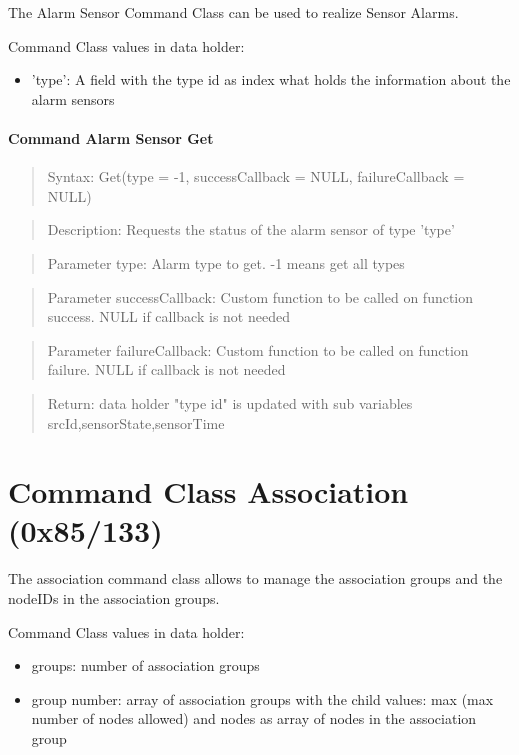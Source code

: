 The Alarm Sensor Command Class can be used to realize Sensor Alarms.

Command Class values in data holder:
\begin{itemize}
\item 'type': A field with the type id as index what holds the information about the alarm sensors
\end{itemize}

\paragraph {Command Alarm Sensor Get}
\begin{quote} Syntax: Get(type = -1, successCallback = NULL, failureCallback = NULL)\end{quote}
\begin{quote} Description: Requests the status of  the alarm sensor of type 'type'\end{quote}
\begin{quote} Parameter type:  Alarm type to get. -1 means get all types\end{quote}
\begin{quote} Parameter successCallback: Custom function to be called on function success. NULL if callback is not needed\end{quote}
\begin{quote} Parameter failureCallback: Custom function to be called on function failure. NULL if callback is not needed\end{quote}
\begin{quote} Return: data holder "type id" is updated with sub variables srcId,sensorState,sensorTime \end{quote}
 
\section{Command Class Association (0x85/133)}

The association command class allows to manage the association groups and the nodeIDs in the association groups.

Command Class values in data holder:
\begin{itemize}
\item groups: number of association groups
\item group number: array of association groups with the child values: 
max (max number of nodes allowed) and nodes as array of nodes in the association group
\end{itemize}


